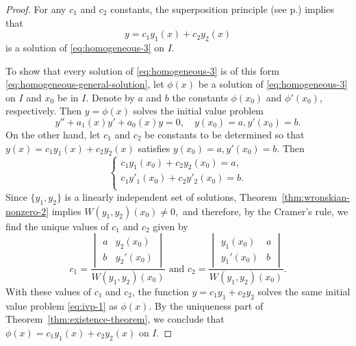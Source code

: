 \begin{proof} 
	For any $c_1$ and $c_2$  constants, the superposition principle (see p.\pageref{superposition}) implies that  
	\[y = c_1 y_1(x) + c_2 y_2(x)\]   is a solution  of \eqref{eq:homogeneous-3} on $I.$
	
	To show that every solution of \eqref{eq:homogeneous-3} is of this form \eqref{eq:homogeneous-general-solution}, let $\phi(x)$ be a solution of \eqref{eq:homogeneous-3}  on $I$ and  $x_0$ be in $I.$ Denote  by $a$ and $b$ the  constants 
	\(\phi(x_0) \) and  \(\phi'(x_0)\), respectively. Then $y = \phi(x)$ solves the initial value problem
	\begin{equation}\label{eq:ivp-1}
		y'' + a_1(x)y' + a_0(x)y = 0, \quad y(x_0) = a, y'(x_0) =b.
	\end{equation}
	On the other hand, let $c_1$ and $c_2$ be constants to be determined so that $y(x) = c_1y_1(x)+ c_2y_2(x)$ satisfies $y(x_0) = a, y'(x_0) = b.$ Then
	\[
	\begin{cases}
		c_1y_1(x_0) +c_2y_2(x_0) = a,\\
		c_1y'_1(x_0) +c_2y'_2(x_0) = b.\\
	\end{cases}
	\] Since $\{y_1, y_2\}$ is a linearly independent set of solutions, Theorem~\ref{thm:wronskian-nonzero-2} implies $W(y_1, y_2)(x_0)\ne 0,$ and therefore, by the Cramer's rule, we find the unique values of $c_1$ and $c_2$ given by
	\[
	c_1 = \frac{
		\begin{vmatrix}
			a & y_2(x_0) \\
			b& y_2'(x_0)
	\end{vmatrix}}{W(y_1, y_2)(x_0)}  \mbox{ and }
	c_2 = \frac{
		\begin{vmatrix}
			y_1(x_0)&a \\
			y_1'(x_0)&b
	\end{vmatrix}}{W(y_1, y_2)(x_0)}.
	\]
	With these values of $c_1$ and $c_2$, the function $y= c_1 y_1 + c_2 y_2$ solves the  same initial value problem \eqref{eq:ivp-1} as $\phi(x)$. By the uniqueness part of Theorem~\ref{thm:existence-theorem}, we conclude that $\phi(x) = c_1 y_1(x) + c_2 y_2(x)$ on \(I.\)
\end{proof}

